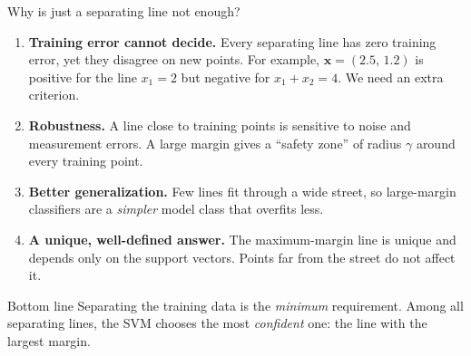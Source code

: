 \documentclass[aspectratio=169,10pt]{beamer}
\newcommand{\x}{\mathbf{x}}
\begin{document}
\begin{frame}{Why is just a separating line not enough?}
\small
\begin{enumerate}
  \item \textbf{Training error cannot decide.} Every separating line has zero training error, yet they disagree on new points. For example, $\x=(2.5,\,1.2)$ is positive for the line $x_1=2$ but negative for $x_1+x_2=4$. We need an extra criterion.
  \item \textbf{Robustness.} A line close to training points is sensitive to noise and measurement errors. A large margin gives a ``safety zone'' of radius $\gamma$ around every training point.
  \item \textbf{Better generalization.} Few lines fit through a wide street, so large-margin classifiers are a \emph{simpler} model class that overfits less.
  \item \textbf{A unique, well-defined answer.} The maximum-margin line is unique and depends only on the support vectors. Points far from the street do not affect it.
\end{enumerate}
\begin{alertblock}{Bottom line}
Separating the training data is the \emph{minimum} requirement. Among all separating lines, the SVM chooses the most \emph{confident} one: the line with the largest margin.
\end{alertblock}
\end{frame}
\end{document}
